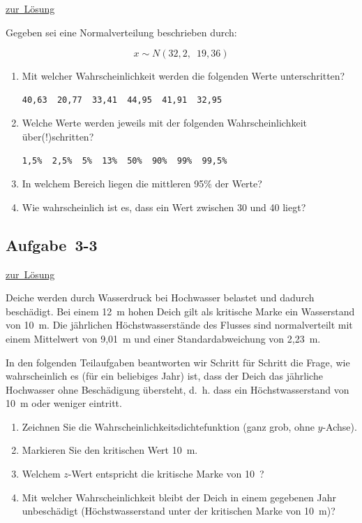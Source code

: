 \documentclass[
  11pt,
  ngerman,
  a4paper,
]{report}
\providecommand{\tightlist}{%
  \setlength{\itemsep}{0pt}\setlength{\parskip}{0pt}}
\begin{document}
\protect\hyperlink{loesung-3-2}{zur~Lösung}

Gegeben sei eine Normalverteilung beschrieben durch:

\[x \sim N(32{,}2,\enspace19{,}36)\]

\begin{enumerate}
\def\labelenumi{\alph{enumi})}
\item
  Mit welcher Wahrscheinlichkeit werden die folgenden Werte unterschritten?

\begin{verbatim}
40,63  20,77  33,41  44,95  41,91  32,95
\end{verbatim}
\item
  Welche Werte werden jeweils mit der folgenden Wahrscheinlichkeit über(!)schritten?

\begin{verbatim}
1,5%  2,5%  5%  13%  50%  90%  99%  99,5%
\end{verbatim}
\item
  In welchem Bereich liegen die mittleren 95\% der Werte?
\item
  Wie wahrscheinlich ist es, dass ein Wert zwischen 30 und 40 liegt?
\end{enumerate}

\hypertarget{aufgabe-3-3}{%
\subsection{Aufgabe~3-3}\label{aufgabe-3-3}}

\protect\hyperlink{loesung-3-3}{zur~Lösung}

Deiche werden durch Wasserdruck bei Hochwasser belastet und dadurch beschädigt. Bei einem 12~m hohen Deich gilt als kritische Marke ein Wasserstand von 10~m. Die jährlichen Höchstwasserstände des Flusses sind normalverteilt mit einem Mittelwert von 9,01~m und einer Standardabweichung von 2,23~m.

In den folgenden Teilaufgaben beantworten wir Schritt für Schritt die Frage, wie wahrscheinlich es (für ein beliebiges Jahr) ist, dass der Deich das jährliche Hochwasser ohne Beschädigung übersteht, d.~h. dass ein Höchstwasserstand von 10~m oder weniger eintritt.

\begin{enumerate}
\def\labelenumi{\alph{enumi})}
\tightlist
\item
  Zeichnen Sie die Wahrscheinlichkeitsdichtefunktion (ganz grob, ohne \(y\)-Achse).
\item
  Markieren Sie den kritischen Wert 10~m.
\item
  Welchem \(z\)-Wert entspricht die kritische Marke von 10~?
\item
  Mit welcher Wahrscheinlichkeit bleibt der Deich in einem gegebenen Jahr unbeschädigt (Höchstwasserstand unter der kritischen Marke von 10~m)?
\end{enumerate}
\end{document}
